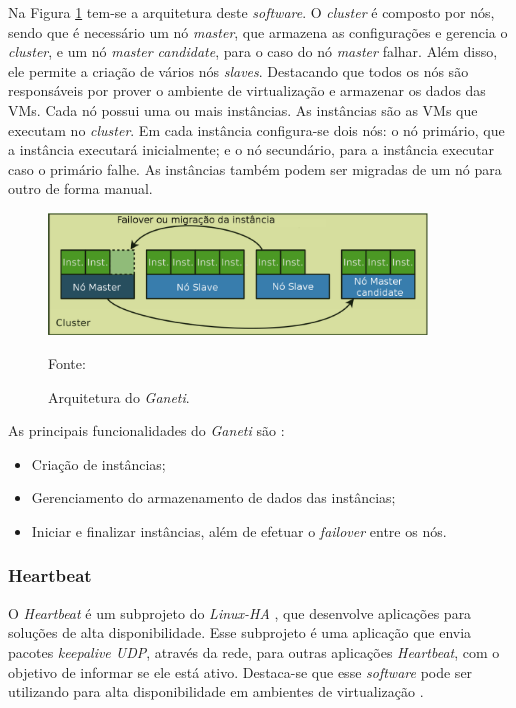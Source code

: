 Na Figura \ref{fig:ganeti_arquitetura} tem-se a arquitetura deste \textit{software}. 
O \textit{cluster} é composto por nós, sendo que é necessário um nó \textit{master}, que armazena as configurações e gerencia o \textit{cluster}, 
e um nó \textit{master candidate}, para o caso do nó \textit{master} falhar. Além disso, ele permite a criação de vários nós \textit{slaves}. 
Destacando que todos os nós são responsáveis por prover o ambiente de virtualização e armazenar os dados das \acp{VM}.
Cada nó possui uma ou mais instâncias. As instâncias são as \acp{VM} que executam no \textit{cluster}. Em cada instância configura-se 
dois nós: o nó primário, que a instância executará inicialmente; e o nó secundário, para a instância executar caso o primário falhe.
As instâncias também podem ser migradas de um nó para outro de forma manual. 

\begin{figure}[h!]
 \centering
 \includegraphics[width=380px]{img/ganeti_arquitetura.eps}
 \caption{Arquitetura do \textit{Ganeti}.}
 Fonte: \citet{carvalho2011}
 \label{fig:ganeti_arquitetura}
\end{figure}

As principais funcionalidades do \textit{Ganeti} são \cite{ganeti}:
\begin{itemize}
 \item Criação de instâncias;
 \item Gerenciamento do armazenamento de dados das instâncias;
 \item Iniciar e finalizar instâncias, além de efetuar o \textit{failover} entre os nós.
\end{itemize}


\subsubsection{Heartbeat}
\label{section:heartbeat}
O \textit{Heartbeat} é um subprojeto do \textit{Linux-HA} \cite{linuxha}, que desenvolve aplicações para soluções de alta disponibilidade.
Esse subprojeto é uma aplicação que envia pacotes \textit{keepalive \ac{UDP}}, através da rede, para outras aplicações \textit{Heartbeat}, 
com o objetivo de informar se ele está ativo.
Destaca-se que esse \textit{software} pode ser utilizando para alta disponibilidade em ambientes de virtualização \cite{reis2009}.

